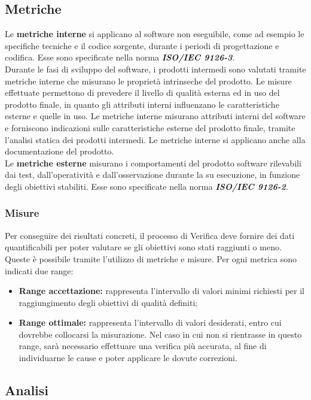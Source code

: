 	\subsection{Metriche}
	Le \textbf{metriche interne} si applicano al software non eseguibile, come ad esempio le specifiche tecniche e il codice sorgente, durante i periodi di progettazione e codifica.
	Esse sono specificate nella norma \textbf{\textit{ISO/IEC 9126-3}}.\\
	Durante le fasi di sviluppo del software, i prodotti intermedi sono valutati tramite metriche interne che misurano le proprietà intrinseche del prodotto.
	Le misure effettuate permettono di prevedere il livello di qualità esterna ed in uso del prodotto finale, in quanto gli attributi interni influenzano le caratteristiche esterne e quelle in uso.
	Le metriche interne misurano attributi interni del software e forniscono indicazioni sulle caratteristiche esterne del prodotto finale, tramite l'analisi statica dei prodotti intermedi.
	Le metriche interne si applicano anche alla documentazione del prodotto.\\
	Le \textbf{metriche esterne} misurano i comportamenti del prodotto software rilevabili dai test, dall'operatività e dall'osservazione durante la su esecuzione, in funzione degli obiettivi stabiliti.
	Esse sono specificate nella norma \textbf{\textit{ISO/IEC 9126-2}}.
		
		\subsubsection{Misure}
		Per conseguire dei risultati concreti, il processo di Verifica deve fornire dei dati quantificabili per poter valutare se gli obiettivi sono stati raggiunti o meno. Queste è possibile tramite l’utilizzo di metriche e misure. Per ogni metrica sono indicati due range:
		\begin{itemize}
			\item \textbf{Range accettazione:} rappresenta l'intervallo di valori minimi richiesti per il raggiungimento degli obiettivi di qualità definiti;
			\item \textbf{Range ottimale:} rappresenta l'intervallo di valori desiderati, entro cui dovrebbe collocarsi la misurazione. Nel caso in cui non si rientrasse in questo range, sarà necessario effettuare una verifica più accurata, al fine di individuarne le cause e poter applicare le dovute correzioni.
		\end{itemize}
	
	\subsection{Analisi}
	

